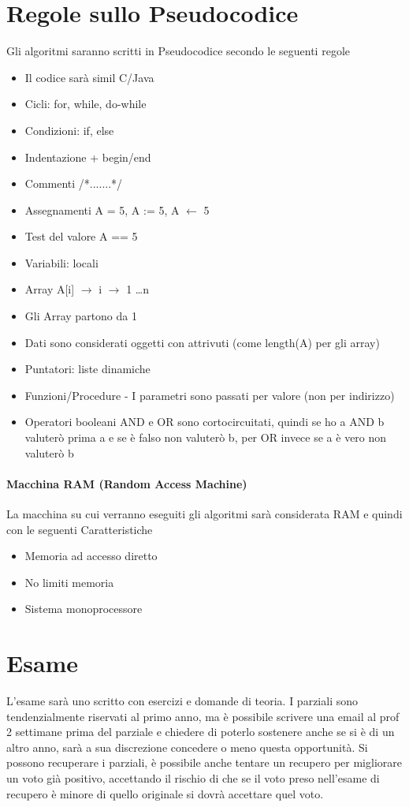 \section{Regole sullo Pseudocodice}
Gli algoritmi saranno scritti in Pseudocodice secondo le seguenti regole
\begin{itemize}
    \item Il codice sarà simil C/Java
    \item Cicli: for, while, do-while
    \item Condizioni: if, else
    \item Indentazione + begin/end
    \item Commenti /*.......*/
    \item Assegnamenti A = 5, A := 5, A $\leftarrow$ 5
    \item Test del valore A == 5
    \item Variabili: locali
    \item Array A[i] $\rightarrow$ i $\rightarrow$ 1 \dots n
    \item Gli Array partono da 1
    \item Dati sono considerati oggetti con attrivuti (come length(A) per gli array)
    \item Puntatori: liste dinamiche
    \item Funzioni/Procedure - I parametri sono passati per valore (non per indirizzo)
    \item Operatori booleani AND e OR sono cortocircuitati, quindi
    se ho a AND b valuterò prima a e se è falso non valuterò b, 
    per OR invece se a è vero non valuterò b
\end{itemize}

\paragraph{Macchina RAM (Random Access Machine)}
La macchina su cui verranno eseguiti gli algoritmi sarà considerata RAM e quindi con le seguenti Caratteristiche
\begin{itemize}
    \item Memoria ad accesso diretto
    \item No limiti memoria
    \item Sistema monoprocessore
\end{itemize}

\section{Esame}
L'esame sarà uno scritto con esercizi e domande di teoria. 
I parziali sono tendenzialmente riservati al primo anno, ma è possibile scrivere una email al prof 2 settimane prima del parziale e chiedere di poterlo sostenere
anche se si è di un altro anno, sarà a sua discrezione concedere o meno questa opportunità.
Si possono recuperare i parziali, è possibile anche tentare un recupero per migliorare un voto già positivo, accettando il rischio di
che se il voto preso nell'esame di recupero è minore di quello originale si dovrà accettare quel voto.

